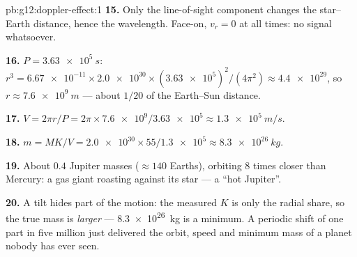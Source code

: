 \begin{solution}{pb:g12:doppler-effect:1}
\textbf{15.} Only the line-of-sight component changes the star--Earth distance, hence
the wavelength. Face-on, $v_r = 0$ at all times: no signal whatsoever.

\textbf{16.} $P = \qty{3.63e5}{s}$: $r^3 = \num{6.67e-11} \times \num{2.0e30} \times
(\num{3.63e5})^2/(4\pi^2) \approx \num{4.4e29}$, so $r \approx \qty{7.6e9}{m}$ ---
about $1/20$ of the Earth--Sun distance.

\textbf{17.} $V = 2\pi r/P = 2\pi \times \num{7.6e9}/\num{3.63e5} \approx
\qty{1.3e5}{m/s}$.

\textbf{18.} $m = M K/V = \num{2.0e30} \times 55/\num{1.3e5} \approx \qty{8.3e26}{kg}$.

\textbf{19.} About $0.4$ Jupiter masses ($\approx 140$ Earths), orbiting $8$ times
closer than Mercury: a gas giant roasting against its star --- a ``hot Jupiter''.

\textbf{20.} A tilt hides part of the motion: the measured $K$ is only the radial
share, so the true mass is \emph{larger} --- \qty{8.3e26}{kg} is a minimum. A periodic
shift of one part in five million just delivered the orbit, speed and minimum mass of a
planet nobody has ever seen.
\end{solution}
